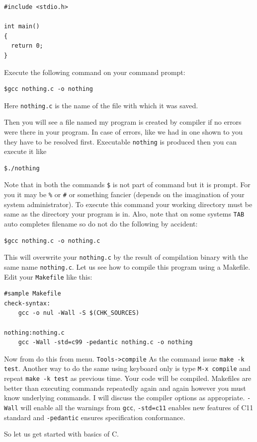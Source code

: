 \begin{verbatim}
#include <stdio.h>

int main()
{
  return 0;
}
\end{verbatim}

Execute the following command on your command prompt:

\begin{verbatim}
$gcc nothing.c -o nothing
\end{verbatim}
Here \texttt{nothing.c} is the name of the file with which it was saved.

Then you will see a file named my program is created by compiler if no errors
were there in your program. In case of errors, like we had in one shown to you
they have to be resolved first. Executable \texttt{nothing} is produced then
you can execute it like

\begin{verbatim}
$./nothing
\end{verbatim}

Note that in both the commands \texttt{\$} is not part of command but it is
prompt. For you it may be \texttt{\%} or \texttt{\#} or something fancier
(depends on the imagination of your system administrator). To execute this
command your working directory must be same as the directory your program is
in. Also, note that on some systems \texttt{TAB} auto completes filename so do
not do the following by accident:

\color{nicered}
\begin{verbatim}
$gcc nothing.c -o nothing.c
\end{verbatim}
\color{black}
This will overwrite your \texttt{nothing.c} by the result of compilation binary
with the same name \texttt{nothing.c}. Let us see how to compile this program
using a Makefile. Edit your \texttt{Makefile} like this:

\begin{verbatim}
#sample Makefile
check-syntax:
    gcc -o nul -Wall -S $(CHK_SOURCES)

nothing:nothing.c
    gcc -Wall -std=c99 -pedantic nothing.c -o nothing
\end{verbatim}

Now from do this from menu. \texttt{Tools->compile} As the command issue
\texttt{make -k test}. Another way to do the same using keyboard only is type
\texttt{M-x compile} and repeat \texttt{make -k test} as previous time. Your
code will be compiled. Makefiles are better than executing commands 
repeatedly again and again however you must know underlying commands. I will
discuss the compiler options as appropriate. \texttt{-Wall} will enable all the
warnings from \texttt{gcc}, \texttt{-std=c11} enables new features of C11
standard and \texttt{-pedantic} ensures specification conformance. 

So let us get started with basics of C.
